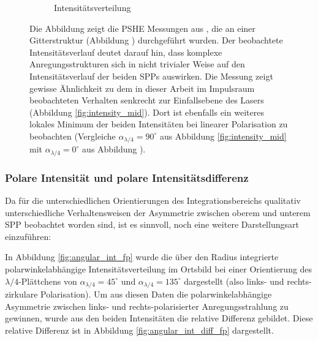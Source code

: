 \documentclass[titlepage,  ngerman]{article}
\begin{document}
\begin{figure}[h]
\begin{subfigure}{0.49\textwidth}
			\caption{Intensitätsverteilung}
			\label{fig:RF_measure_int}
		\end{subfigure}
		\caption[Vergleichsmessung aus \cite{RodriguezFortuno.2013}]{Die Abbildung  zeigt die PSHE Messungen aus \cite{RodriguezFortuno.2013}, die an einer Gitterstruktur (Abbildung ) durchgeführt wurden. Der beobachtete Intensitätsverlauf deutet darauf hin, dass komplexe Anregungsstrukturen sich in nicht trivialer Weise auf den Intensitätsverlauf der beiden SPPs auswirken. Die Messung zeigt gewisse Ähnlichkeit zu dem in dieser Arbeit im Impulsraum beobachteten Verhalten senkrecht zur Einfallsebene des Lasers (Abbildung \ref{fig:intensity_mid}). Dort ist ebenfalls ein weiteres lokales Minimum der beiden Intensitäten bei linearer Polarisation zu beobachten (Vergleiche $\alpha_{\lambda/4}= 90^\circ$ aus Abbildung \ref{fig:intensity_mid} mit $\alpha_{\lambda/4}= 0^\circ$ aus Abbildung ).}
		\label{fig:RF_measure}		
	\end{figure}
	\FloatBarrier
	\subsubsection{Polare Intensität und polare Intensitätsdifferenz}
		\label{sec:polar_int}	
		Da für die unterschiedlichen Orientierungen des Integrationsbereichs qualitativ unterschiedliche Verhaltensweisen der Asymmetrie zwischen oberem und unterem SPP beobachtet worden sind, ist es sinnvoll, noch eine weitere Darstellungsart einzuführen:		
		
		 In Abbildung \ref{fig:angular_int_fp} wurde die über den Radius integrierte polarwinkelabhängige Intensitätsverteilung im Ortsbild bei einer Orientierung des $\lambda / 4$-Plättchens von $\alpha_{\lambda/4} = 45^\circ$ und  $\alpha_{\lambda/4} = 135^\circ$ dargestellt (also links- und rechts-zirkulare Polarisation). Um aus diesen Daten die polarwinkelabhängige Asymmetrie zwischen links- und rechts-polarisierter Anregungsstrahlung zu gewinnen, wurde aus den beiden Intensitäten die relative Differenz gebildet. Diese relative Differenz ist in Abbildung \ref{fig:angular_int_diff_fp} dargestellt.
\end{document}
